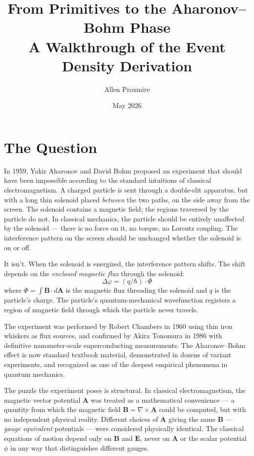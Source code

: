 \documentclass[11pt,a4paper]{article}
\title{\vspace{-1cm}\Large\bfseries From Primitives to the Aharonov--Bohm Phase\\[6pt]
\large\mdseries A Walkthrough of the Event Density Derivation}
\author{Allen Proxmire}
\date{May 2026}
\begin{document}
\maketitle
\thispagestyle{empty}

\section{The Question}

In 1959, Yakir Aharonov and David Bohm proposed an experiment that should have been impossible according to the standard intuitions of classical electromagnetism. A charged particle is sent through a double-slit apparatus, but with a long thin solenoid placed \emph{between} the two paths, on the side away from the screen. The solenoid contains a magnetic field; the regions traversed by the particle do not. In classical mechanics, the particle should be entirely unaffected by the solenoid --- there is no force on it, no torque, no Lorentz coupling. The interference pattern on the screen should be unchanged whether the solenoid is on or off.

It isn't. When the solenoid is energized, the interference pattern shifts. The shift depends on the \emph{enclosed magnetic flux} through the solenoid:
\[
\Delta \varphi = (q/\hbar) \cdot \Phi
\]
where $\Phi = \int \mathbf{B} \cdot d\mathbf{A}$ is the magnetic flux threading the solenoid and $q$ is the particle's charge. The particle's quantum-mechanical wavefunction registers a region of magnetic field through which the particle never travels.

The experiment was performed by Robert Chambers in 1960 using thin iron whiskers as flux sources, and confirmed by Akira Tonomura in 1986 with definitive nanometer-scale superconducting measurements. The Aharonov--Bohm effect is now standard textbook material, demonstrated in dozens of variant experiments, and recognized as one of the deepest empirical phenomena in quantum mechanics.

The puzzle the experiment poses is structural. In classical electromagnetism, the magnetic vector potential $\mathbf{A}$ was treated as a mathematical convenience --- a quantity from which the magnetic field $\mathbf{B} = \nabla \times \mathbf{A}$ could be computed, but with no independent physical reality. Different choices of $\mathbf{A}$ giving the same $\mathbf{B}$ --- \emph{gauge equivalent} potentials --- were considered physically identical. The classical equations of motion depend only on $\mathbf{B}$ and $\mathbf{E}$, never on $\mathbf{A}$ or the scalar potential $\phi$ in any way that distinguishes different gauges.
\end{document}
